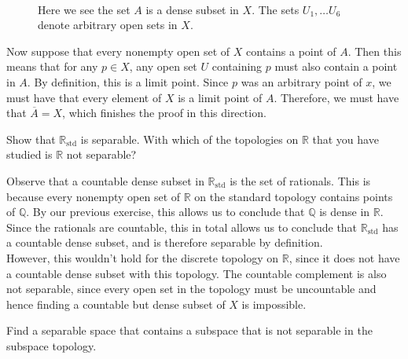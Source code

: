 \documentclass[a4paper,12pt,twoside]{hmcpset}
\begin{document}
\begin{solution}
\begin{figure}[h!]
    \begin{caption}\\
        Here we see the set \color{blue}$A$ \color{black}is a dense subset in $X$. The
        sets $U_1, \dots U_6$ denote arbitrary open sets in $X$.
    \end{caption}
\end{figure}


Now suppose that every nonempty open set of $X$ contains a point of $A$. 
Then this means that for any $p \in X$, any open set $U$ containing $p$ 
must also contain a point in $A$. By definition, this is a limit point.
Since $p$ was an arbitrary point of $x$, we must have that every element 
of $X$ is a limit point of $A$. Therefore, we must have that 
$\overline{A} = X$, which finishes the proof in this direction. 
\end{solution}

\begin{exercise}[Exercise 6.2]
Show that $\mathbb{R}_{\text{std}}$ is separable.
With which of the topologies on $\mathbb{R}$ that you have studied is
$\mathbb{R}$ not separable?
\end{exercise}

\begin{solution}
Observe that a countable dense subset in $\mathbb{R}_{\text{std}}$ is the 
set of rationals. This is because every nonempty open set of $\mathbb{R}$
on the standard topology contains points of $\mathbb{Q}$. By our previous 
exercise, this allows us to conclude that $\mathbb{Q}$ is dense in $\mathbb{R}$.
Since the rationals are countable, this in total allows us to conclude that 
$\mathbb{R}_{\text{std}}$ has a countable dense subset, and is therefore 
separable by definition. \\
However, this wouldn't hold for the discrete 
topology on $\mathbb{R}$, since it does not have a countable dense subset 
with this topology. The countable complement is also not separable, since 
every open set in the topology must be uncountable and hence finding a 
countable but dense subset of $X$ is impossible.
\end{solution}

\begin{exercise}[Exercise 6.4]
Find a separable space that contains a subspace that 
is not separable in the subspace topology.
\end{exercise}
\end{document}
